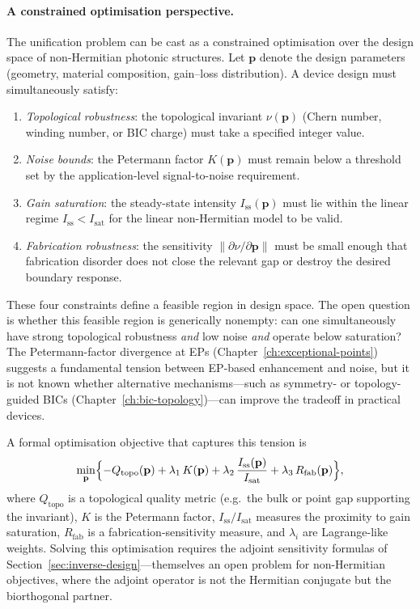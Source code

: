 \paragraph{A constrained optimisation perspective.}
The unification problem can be cast as a constrained optimisation over
the design space of non-Hermitian photonic structures. Let
$\mathbf{p}$ denote the design parameters (geometry, material
composition, gain--loss distribution). A device design must
simultaneously satisfy:
\begin{enumerate}
 \item \emph{Topological robustness}: the topological invariant
 $\nu(\mathbf{p})$ (Chern number, winding number, or BIC charge) must
 take a specified integer value.
 \item \emph{Noise bounds}: the Petermann factor
 $K(\mathbf{p})$ must remain below a threshold set by the
 application-level signal-to-noise requirement.
 \item \emph{Gain saturation}: the steady-state intensity
 $I_{\mathrm{ss}}(\mathbf{p})$ must lie within the linear regime
 $I_{\mathrm{ss}} < I_{\mathrm{sat}}$ for the linear non-Hermitian
 model to be valid.
 \item \emph{Fabrication robustness}: the sensitivity
 $\|\partial\nu/\partial\mathbf{p}\|$ must be small enough that
 fabrication disorder does not close the relevant gap or destroy the
 desired boundary response.
\end{enumerate}
These four constraints define a feasible region in design space. The
open question is whether this feasible region is generically nonempty:
can one simultaneously have strong topological robustness
\emph{and} low noise \emph{and} operate below saturation? The
Petermann-factor divergence at EPs
(Chapter~\ref{ch:exceptional-points}) suggests a fundamental tension
between EP-based enhancement and noise, but it is not known whether
alternative mechanisms---such as symmetry- or topology-guided BICs
(Chapter~\ref{ch:bic-topology})---can improve the tradeoff in practical
devices.

A formal optimisation objective that captures this tension is
\begin{equation}
 \min_{\mathbf{p}} \Bigl\{
 -Q_{\mathrm{topo}}(\mathbf{p})
 + \lambda_1\,K(\mathbf{p})
 + \lambda_2\,\frac{I_{\mathrm{ss}}(\mathbf{p})}{I_{\mathrm{sat}}}
 + \lambda_3\,R_{\mathrm{fab}}(\mathbf{p})
 \Bigr\},
 \label{eq:unified-objective}
\end{equation}
where $Q_{\mathrm{topo}}$ is a topological quality metric (e.g.\ the
bulk or point gap supporting the invariant), $K$ is the Petermann factor,
$I_{\mathrm{ss}}/I_{\mathrm{sat}}$ measures the proximity to gain
saturation, $R_{\mathrm{fab}}$ is a fabrication-sensitivity measure, and
$\lambda_i$ are Lagrange-like weights. Solving this optimisation
requires the adjoint sensitivity formulas of
Section~\ref{sec:inverse-design}---themselves an open problem for
non-Hermitian objectives, where the adjoint operator is not the
Hermitian conjugate but the biorthogonal partner.

